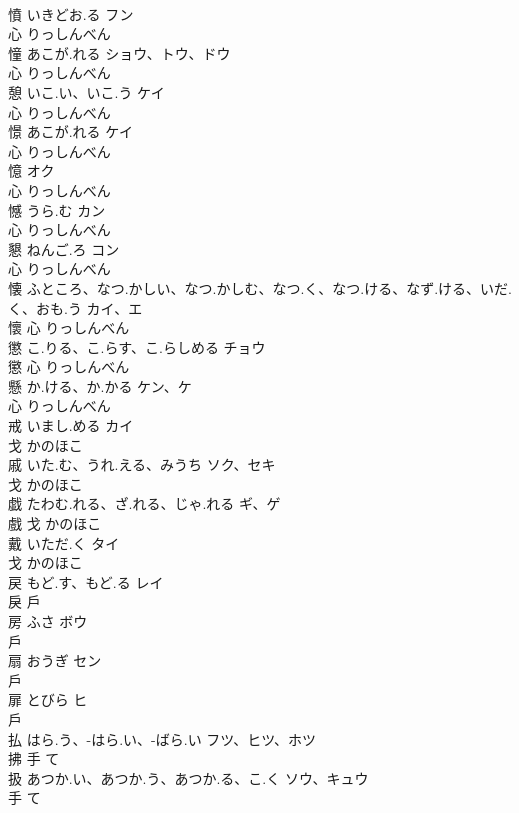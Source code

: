 \documentclass[8pt]{extreport}
\begin{document}
\begin{CJK}{UTF8}{min}
\\	憤	いきどお.る	フン	
\\	心		りっしんべん		
\\	憧	あこが.れる	ショウ、トウ、ドウ	
\\	心		りっしんべん		
\\	憩	いこ.い、いこ.う	ケイ	
\\	心		りっしんべん		
\\	憬	あこが.れる	ケイ	
\\	心		りっしんべん		
\\	憶		オク	
\\	心		りっしんべん		
\\	憾	うら.む	カン	
\\	心		りっしんべん		
\\	懇	ねんご.ろ	コン	
\\	心		りっしんべん		
\\	懐	ふところ、なつ.かしい、なつ.かしむ、なつ.く、なつ.ける、なず.ける、いだ.く、おも.う	カイ、エ	
\\	懷	心		りっしんべん		
\\	懲	こ.りる、こ.らす、こ.らしめる	チョウ	
\\	懲	心		りっしんべん		
\\	懸	か.ける、か.かる	ケン、ケ	
\\	心		りっしんべん		
\\	戒	いまし.める	カイ	
\\	戈		かのほこ		
\\	戚	いた.む、うれ.える、みうち	ソク、セキ	
\\	戈		かのほこ		
\\	戯	たわむ.れる、ざ.れる、じゃ.れる	ギ、ゲ	
\\	戲	戈		かのほこ		
\\	戴	いただ.く	タイ	
\\	戈		かのほこ		
\\	戻	もど.す、もど.る	レイ	
\\	戾	戶				
\\	房	ふさ	ボウ	
\\	戶				
\\	扇	おうぎ	セン	
\\	戶				
\\	扉	とびら	ヒ	
\\	戶				
\\	払	はら.う、-はら.い、-ばら.い	フツ、ヒツ、ホツ	
\\	拂	手		て		
\\	扱	あつか.い、あつか.う、あつか.る、こ.く	ソウ、キュウ	
\\	手		て		

\end{CJK}
\end{document}
